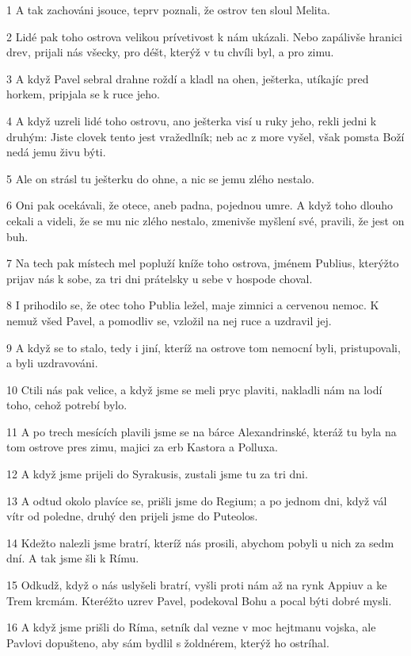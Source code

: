 \par 1 A tak zachováni jsouce, teprv poznali, že ostrov ten sloul Melita.
\par 2 Lidé pak toho ostrova velikou prívetivost k nám ukázali. Nebo zapálivše hranici drev, prijali nás všecky, pro déšt, kterýž v tu chvíli byl, a pro zimu.
\par 3 A když Pavel sebral drahne roždí a kladl na ohen, ješterka, utíkajíc pred horkem, pripjala se k ruce jeho.
\par 4 A když uzreli lidé toho ostrovu, ano ješterka visí u ruky jeho, rekli jedni k druhým: Jiste clovek tento jest vražedlník; neb ac z more vyšel, však pomsta Boží nedá jemu živu býti.
\par 5 Ale on strásl tu ješterku do ohne, a nic se jemu zlého nestalo.
\par 6 Oni pak ocekávali, že otece, aneb padna, pojednou umre. A když toho dlouho cekali a videli, že se mu nic zlého nestalo, zmenivše myšlení své, pravili, že jest on buh.
\par 7 Na tech pak místech mel popluží kníže toho ostrova, jménem Publius, kterýžto prijav nás k sobe, za tri dni prátelsky u sebe v hospode choval.
\par 8 I prihodilo se, že otec toho Publia ležel, maje zimnici a cervenou nemoc. K nemuž všed Pavel, a pomodliv se, vzložil na nej ruce a uzdravil jej.
\par 9 A když se to stalo, tedy i jiní, kteríž na ostrove tom nemocní byli, pristupovali, a byli uzdravováni.
\par 10 Ctili nás pak velice, a když jsme se meli pryc plaviti, nakladli nám na lodí toho, cehož potrebí bylo.
\par 11 A po trech mesících plavili jsme se na bárce Alexandrinské, kteráž tu byla na tom ostrove pres zimu, majici za erb Kastora a Polluxa.
\par 12 A když jsme prijeli do Syrakusis, zustali jsme tu za tri dni.
\par 13 A odtud okolo plavíce se, prišli jsme do Regium; a po jednom dni, když vál vítr od poledne, druhý den prijeli jsme do Puteolos.
\par 14 Kdežto nalezli jsme bratrí, kteríž nás prosili, abychom pobyli u nich za sedm dní. A tak jsme šli k Rímu.
\par 15 Odkudž, když o nás uslyšeli bratrí, vyšli proti nám až na rynk Appiuv a ke Trem krcmám. Kteréžto uzrev Pavel, podekoval Bohu a pocal býti dobré mysli.
\par 16 A když jsme prišli do Ríma, setník dal vezne v moc hejtmanu vojska, ale Pavlovi dopušteno, aby sám bydlil s žoldnérem, kterýž ho ostríhal.
